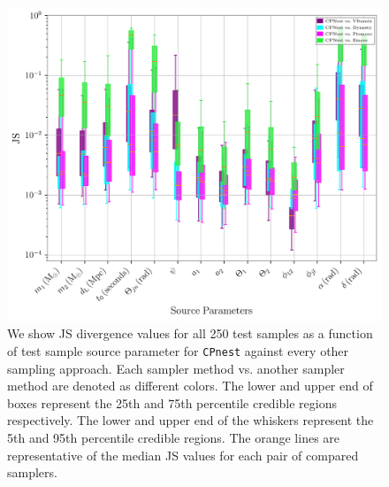 \begin{figure}
    \includegraphics[width=\columnwidth]{figures/JS_IndiPar_cpnest.png}
    \caption[JS divergences of individual source parameters for \texttt{CPNest} against all other approaches.]{\label{fig:JS_indi_par_cpnest} We show JS divergence values for all 250 test samples as a function of test sample source parameter for \texttt{CPnest} against every other sampling approach. Each sampler method vs. another sampler method are denoted as different colors. The lower and upper end of boxes represent the 25th and 75th percentile credible regions respectively. The lower and upper end of the whiskers represent the 5th and 95th percentile credible regions. The orange lines are representative of the median JS values for each pair of compared samplers.}
\end{figure}

%
%


